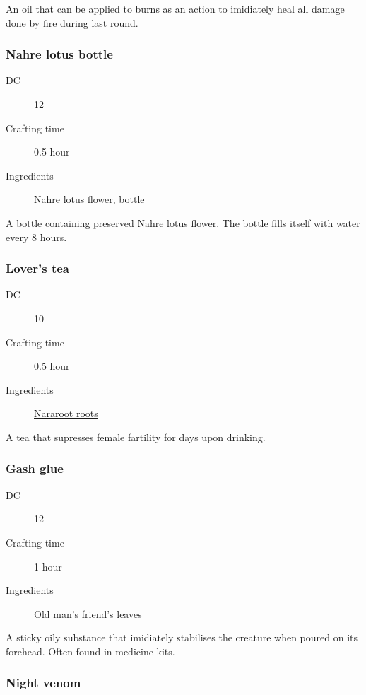 An oil that can be applied to burns as an action to imidiately heal all damage done by fire 
during last round.

\subsubsection{Nahre lotus bottle}
\label{}

\begin{description}
\item [DC] 12
\item [Crafting time] 0.5 hour
\item [Ingredients] \hyperref[Nahre Lotus]{Nahre lotus flower}, bottle
\end{description}

A bottle containing preserved Nahre lotus flower. The bottle fills itself with water every 8 hours.

\subsubsection{Lover's tea}
\label{Lover's tea}

\begin{description}
\item [DC] 10
\item [Crafting time] 0.5 hour
\item [Ingredients] \hyperref[Nararoot]{Nararoot roots}
\end{description}

A tea that supresses female fartility for  days upon drinking.

\subsubsection{Gash glue}
\label{Gash glue}

\begin{description}
\item [DC] 12
\item [Crafting time] 1 hour
\item [Ingredients] \hyperref[Old Man's Friend]{Old man's friend's leaves}
\end{description}

A sticky oily substance that imidiately stabilises the creature when poured on its forehead. 
Often found in medicine kits.

\subsubsection{Night venom}


